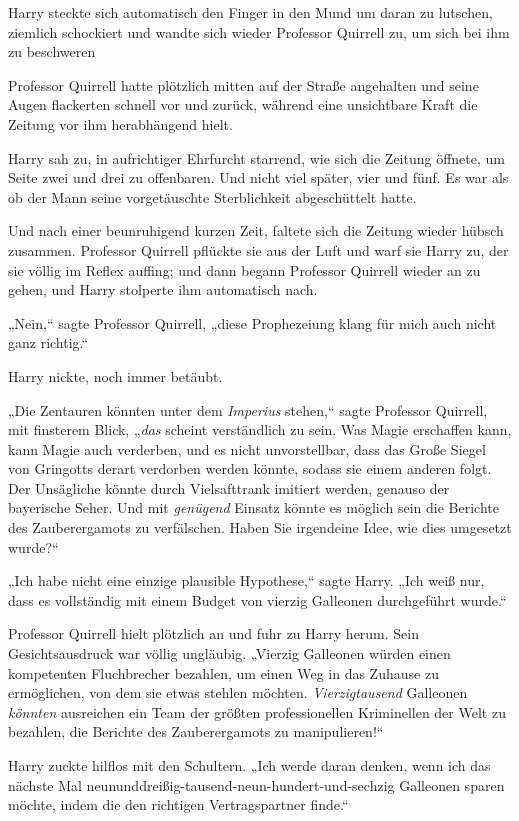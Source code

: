 {Harry steckte sich automatisch den Finger in den Mund um daran zu lutschen, ziemlich schockiert und wandte sich wieder Professor Quirrell zu, um sich bei ihm zu beschweren \later

Professor Quirrell hatte plötzlich mitten auf der Straße angehalten und seine Augen flackerten schnell vor und zurück, während eine unsichtbare Kraft die Zeitung vor ihm herabhängend hielt.

Harry sah zu, in aufrichtiger Ehrfurcht starrend, wie sich die Zeitung öffnete, um Seite zwei und drei zu offenbaren. Und nicht viel später, vier und fünf. Es war als ob der Mann seine vorgetäuschte Sterblichkeit abgeschüttelt hatte.

Und nach einer beunruhigend kurzen Zeit, faltete sich die Zeitung wieder hübsch zusammen. Professor Quirrell pflückte sie aus der Luft und warf sie Harry zu, der sie völlig im Reflex auffing; und dann begann Professor Quirrell wieder an zu gehen, und Harry stolperte ihm automatisch nach.

„Nein,“ sagte Professor Quirrell, „diese Prophezeiung klang für mich auch nicht ganz richtig.“

Harry nickte, noch immer betäubt.

„Die Zentauren könnten unter dem \emph{Imperius} stehen,“ sagte Professor Quirrell, mit finsterem Blick, „\emph{das} scheint verständlich zu sein. Was Magie erschaffen kann, kann Magie auch verderben, und es nicht unvorstellbar, dass das Große Siegel von Gringotts derart verdorben werden könnte, sodass sie einem anderen folgt. Der Unsägliche könnte durch Vielsafttrank imitiert werden, genauso der bayerische Seher. Und mit \emph{genügend} Einsatz könnte es möglich sein die Berichte des Zauberergamots zu verfälschen. Haben Sie irgendeine Idee, wie dies umgesetzt wurde?“

„Ich habe nicht eine einzige plausible Hypothese,“ sagte Harry. „Ich weiß nur, dass es vollständig mit einem Budget von vierzig Galleonen durchgeführt wurde.“

Professor Quirrell hielt plötzlich an und fuhr zu Harry herum. Sein Gesichtsausdruck war völlig ungläubig. „Vierzig Galleonen würden einen kompetenten Fluchbrecher bezahlen, um einen Weg in das Zuhause zu ermöglichen, von dem sie etwas stehlen möchten. \emph{Vierzigtausend} Galleonen \emph{könnten} ausreichen ein Team der größten professionellen Kriminellen der Welt zu bezahlen, die Berichte des Zauberergamots zu manipulieren!“

Harry zuckte hilflos mit den Schultern. „Ich werde daran denken, wenn ich das nächste Mal neununddreißig-tausend-neun-hundert-und-sechzig Galleonen sparen möchte, indem die den richtigen Vertragspartner finde.“

}
